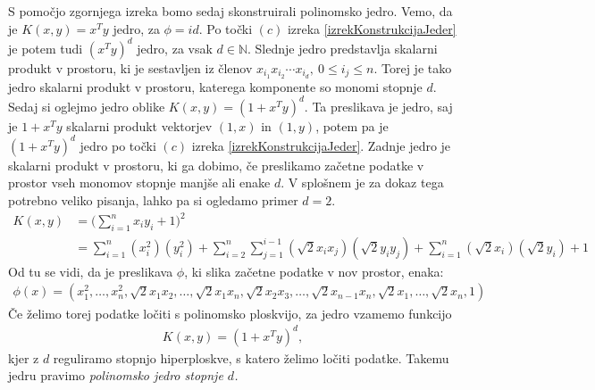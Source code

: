 \documentclass[mat1]{fmfdelo}
\newcommand{\N}{\mathbb N}
\begin{document}
S pomočjo zgornjega izreka bomo sedaj skonstruirali polinomsko jedro. Vemo, da je $K(x, y) = x^Ty$ jedro, za $\phi = id$. Po točki $(c)$ izreka \ref{izrekKonstrukcijaJeder} je potem tudi $(x^Ty)^d$ jedro, za vsak $d \in \N$. Slednje jedro predstavlja skalarni produkt v prostoru, ki je sestavljen iz členov $x_{i_1}x_{i_2}\cdots x_{i_d},~ 0 \le i_j \le n$. Torej je tako jedro skalarni produkt v prostoru, katerega komponente so monomi stopnje $d.$ Sedaj si oglejmo jedro oblike $K(x, y) = (1+x^Ty)^d$. Ta preslikava je jedro, saj je $1+x^Ty$ skalarni produkt vektorjev $(1, x)$ in $(1, y)$, potem pa je $(1+x^Ty)^d$ jedro po točki $(c)$ izreka \ref{izrekKonstrukcijaJeder}. Zadnje jedro je skalarni produkt v prostoru, ki ga dobimo, če preslikamo začetne podatke v prostor vseh monomov stopnje manjše ali enake $d$. V splošnem je za dokaz tega potrebno veliko pisanja, lahko pa si ogledamo primer $d = 2$.
\begin{align*}
	K(x, y) &= \Bigg(\sum_{i=1}^{n}x_iy_i + 1\Bigg)^2 \\
	&= \sum_{i = 1}^{n}(x_i^2)(y_i^2) + \sum_{i=2}^{n}\sum_{j=1}^{i-1}(\sqrt{2}x_ix_j)(\sqrt{2}y_iy_j) + \sum_{i=1}^{n}(\sqrt{2}x_i)(\sqrt{2}y_i) + 1
\end{align*}
Od tu se vidi, da je preslikava  $\phi$, ki slika začetne podatke v nov prostor, enaka: 
\begin{align*}
	\phi(x) = (x_1^2, \ldots, x_n^2, \sqrt{2}x_1 x_2, \ldots, \sqrt{2}x_1x_n, \sqrt{2}x_2x_3,\ldots, \sqrt{2}x_{n-1}x_n, \sqrt{2}x_1, \ldots, \sqrt{2}x_n, 1)
\end{align*}
 Če želimo torej  podatke ločiti s polinomsko ploskvijo, za jedro vzamemo funkcijo 
\begin{align*}
K(x, y) = (1 + x^Ty)^d,
\end{align*}
kjer z $d$ reguliramo stopnjo hiperploskve, s katero želimo ločiti podatke. Takemu jedru pravimo \emph{polinomsko jedro stopnje $d$.} 
\end{document}
